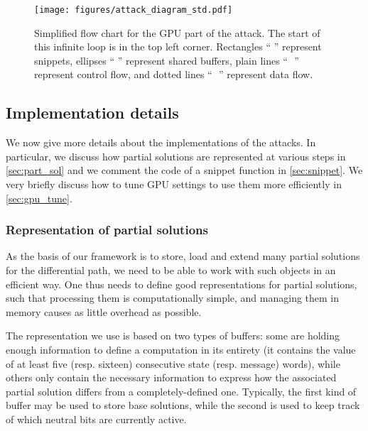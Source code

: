 \begin{figure}[htb]
  \begin{center}
  \texttt{[image: figures/attack\_diagram\_std.pdf]}
  \end{center}
  \caption[Simplified flow chart for the GPU part of the attack.]{Simplified flow chart for the GPU part of the attack. The start of this infinite loop is
  in the top left corner. Rectangles ``\,\protect\rectanMac\,'' represent
  snippets, ellipses ``\,\protect\elliMac\,''
  represent shared buffers, plain lines ``\,\protect\plainMac~''
  represent control flow, and dotted lines ``\,\protect\dottMac~'' represent data flow.}
  \label{fig:attack_diagram}
\end{figure}


\subsection{Implementation details}

We now give more details about the implementations of the attacks. In particular, we discuss
how partial solutions are represented at various steps in \autoref{sec:part_sol} and
we comment the code of a snippet function in \autoref{sec:snippet}. We very briefly discuss how
to tune GPU settings to use them more efficiently in \autoref{sec:gpu_tune}.

\subsubsection{Representation of partial solutions}
\label{sec:part_sol}

As the basis of our framework is to store, load and extend many partial solutions for the differential path, we need to be able to work with such objects
in an efficient way. One thus needs to define good representations for partial solutions, such that processing them is computationally simple, and managing them
in memory causes as little overhead as possible.

The representation we use is based on two types of buffers: some are holding enough information to define a \sha computation in its entirety (\ie it
contains the value of at least five (resp. sixteen) consecutive state (resp. message) words), while others only contain the necessary information to
express how the associated partial solution differs from a completely-defined one. Typically, the first kind of buffer may be used to store base solutions,
while the second is used to keep track of which neutral bits are currently active.

